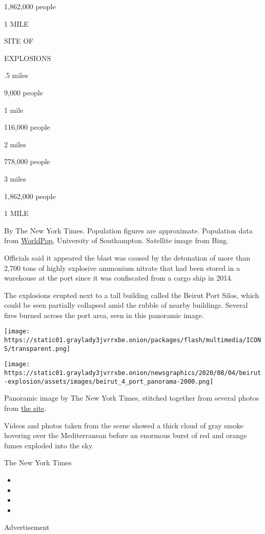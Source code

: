 1,862,000 people

1 MILE

SITE OF

EXPLOSIONS

.5 miles

9,000 people

1 mile

116,000 people

2 miles

778,000 people

3 miles

1,862,000 people

1 MILE

By The New York Times. Population figures are approximate. Population
data from \href{https://www.worldpop.org/}{WorldPop}, University of
Southampton. Satellite image from Bing.

Officials said it appeared the blast was caused by the detonation of
more than 2,700 tons of highly explosive ammonium nitrate that had been
stored in a warehouse at the port since it was confiscated from a cargo
ship in 2014.

The explosions erupted next to a tall building called the Beirut Port
Silos, which could be seen partially collapsed amid the rubble of nearby
buildings. Several fires burned across the port area, seen in this
panoramic image.

\texttt{[image: https://static01.graylady3jvrrxbe.onion/packages/flash/multimedia/ICONS/transparent.png]}

\texttt{[image: https://static01.graylady3jvrrxbe.onion/newsgraphics/2020/08/04/beirut-explosion/assets/images/beirut\_4\_port\_panorama-2000.png]}

Panoramic image by The New York Times, stitched together from several
photos from
\href{https://twitter.com/PsychologyDoc/status/1290705761467801601}{the
site}.

Videos and photos taken from the scene showed a thick cloud of gray
smoke hovering over the Mediterranean before an enormous burst of red
and orange fumes exploded into the sky.

The New York Times

\begin{itemize}
\item
\item
\item
\item
\end{itemize}

Advertisement


